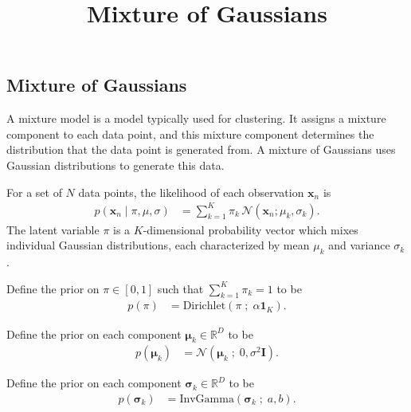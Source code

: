 \title{Mixture of Gaussians}

\subsection{Mixture of Gaussians}

A mixture model is a model typically used for clustering.
It assigns a mixture component to each data point, and this mixture component
determines the distribution that the data point is generated from. A
mixture of Gaussians uses Gaussian distributions to generate this data.

For a set of $N$ data points,
the likelihood of each observation $\mathbf{x}_n$ is
\begin{align*}
  p(\mathbf{x}_n \mid \pi, \mu, \sigma)
  &=
  \sum_{k=1}^K \pi_k \, \mathcal{N}(\mathbf{x}_n ; \mu_k, \sigma_k).
\end{align*}
The latent variable $\pi$ is a $K$-dimensional probability vector
which mixes individual Gaussian distributions, each
characterized by mean $\mu_k$ and variance $\sigma_k$.

Define the prior on $\pi\in[0,1]$ such that $\sum_{k=1}^K\pi_k=1$ to be
\begin{align*}
  p(\pi)
  &=
  \text{Dirichlet}(\pi \;;\; \alpha \mathbf{1}_{K}).
\end{align*}

Define the prior on each component $\mathbf{\mu}_k\in\mathbb{R}^D$ to be
\begin{align*}
  p(\mathbf{\mu}_k)
  &=
  \mathcal{N}(\mathbf{\mu}_k \;;\; 0, \sigma^2\mathbf{I}).
\end{align*}

Define the prior on each component $\mathbf{\sigma}_k\in\mathbb{R}^D$ to be
\begin{align*}
  p(\mathbf{\sigma}_k)
  &=
  \text{InvGamma}(\mathbf{\sigma}_k \;;\; a, b).
\end{align*}

